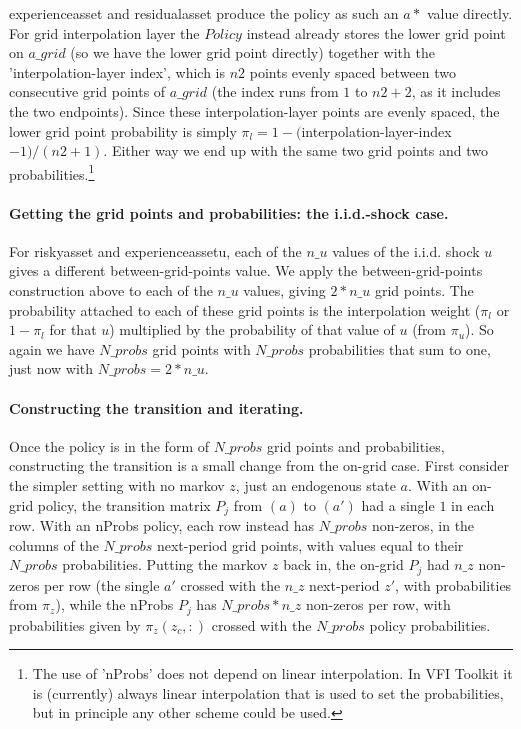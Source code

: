 experienceasset and residualasset produce the policy as such an $a*$ value directly. For grid interpolation layer the $Policy$ instead already stores the lower grid point on $a\_{}grid$ (so we have the lower grid point directly) together with the 'interpolation-layer index', which is $n2$ points evenly spaced between two consecutive grid points of $a\_{}grid$ (the index runs from $1$ to $n2+2$, as it includes the two endpoints). Since these interpolation-layer points are evenly spaced, the lower grid point probability is simply $\pi_l=1-($interpolation-layer-index$-1)/(n2+1)$. Either way we end up with the same two grid points and two probabilities.\footnote{The use of 'nProbs' does not depend on linear interpolation. In VFI Toolkit it is (currently) always linear interpolation that is used to set the probabilities, but in principle any other scheme could be used.}

\paragraph{Getting the grid points and probabilities: the i.i.d.-shock case.}
For riskyasset and experienceassetu, each of the $n\_{}u$ values of the i.i.d. shock $u$ gives a different between-grid-points value. We apply the between-grid-points construction above to each of the $n\_{}u$ values, giving $2*n\_{}u$ grid points. The probability attached to each of these grid points is the interpolation weight ($\pi_l$ or $1-\pi_l$ for that $u$) multiplied by the probability of that value of $u$ (from $\pi_u$). So again we have $N\_{}probs$ grid points with $N\_{}probs$ probabilities that sum to one, just now with $N\_{}probs=2*n\_{}u$.

\paragraph{Constructing the transition and iterating.}
Once the policy is in the form of $N\_{}probs$ grid points and probabilities, constructing the transition is a small change from the on-grid case. First consider the simpler setting with no markov $z$, just an endogenous state $a$. With an on-grid policy, the transition matrix $P_j$ from $(a)$ to $(a')$ had a single $1$ in each row. With an nProbs policy, each row instead has $N\_{}probs$ non-zeros, in the columns of the $N\_{}probs$ next-period grid points, with values equal to their $N\_{}probs$ probabilities. Putting the markov $z$ back in, the on-grid $P_j$ had $n\_{}z$ non-zeros per row (the single $a'$ crossed with the $n\_{}z$ next-period $z'$, with probabilities from $\pi_z$), while the nProbs $P_j$ has $N\_{}probs*n\_{}z$ non-zeros per row, with probabilities given by $\pi_z(z_c,:)$ crossed with the $N\_{}probs$ policy probabilities.

